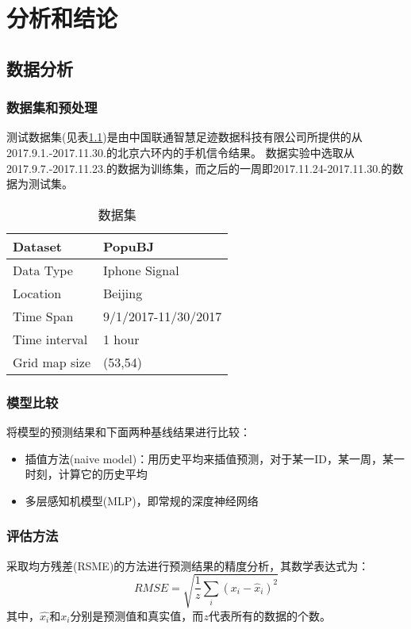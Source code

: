 
\chapter{分析和结论} %

\label{Chapter4} 
\section{数据分析}
\subsection{数据集和预处理}
测试数据集(见表\ref{table:data})是由中国联通智慧足迹数据科技有限公司所提供的从2017.9.1.-2017.11.30.的北京六环内的手机信令结果。 数据实验中选取从 2017.9.7.-2017.11.23.的数据为训练集，而之后的一周即2017.11.24-2017.11.30.的数据为测试集。
\begin{table}
\centering
\caption{数据集}
\label{table:data}
\begin{tabular}{p{}|p{}}
\hline
\hline
\textbf{Dataset} & \textbf{PopuBJ}\\
\hline
Data Type& Iphone Signal\\
\hline
Location & Beijing\\
\hline
Time Span & 9/1/2017-11/30/2017\\
\hline
Time interval & 1 hour\\
\hline
Grid map size & (53,54)\\
\hline
\hline
\end{tabular}
\end{table}
\subsection{模型比较}
将模型的预测结果和下面两种基线结果进行比较：
\begin{itemize}
	\item 插值方法(naive model)：用历史平均来插值预测，对于某一ID，某一周，某一时刻，计算它的历史平均
	\item 多层感知机模型(MLP)，即常规的深度神经网络
\end{itemize}
\subsection{评估方法}
采取均方残差(RSME)的方法进行预测结果的精度分析，其数学表达式\cite{friedman2001elements}为：
\begin{equation}
R M S E = \sqrt { \frac { 1 } { z } \sum _ { i } \left( x _ { i } - \hat { x } _ { i } \right) ^ { 2 } }
\end{equation}
其中，$\hat{x_i}$和$x_i$分别是预测值和真实值，而$z$代表所有的数据的个数。
